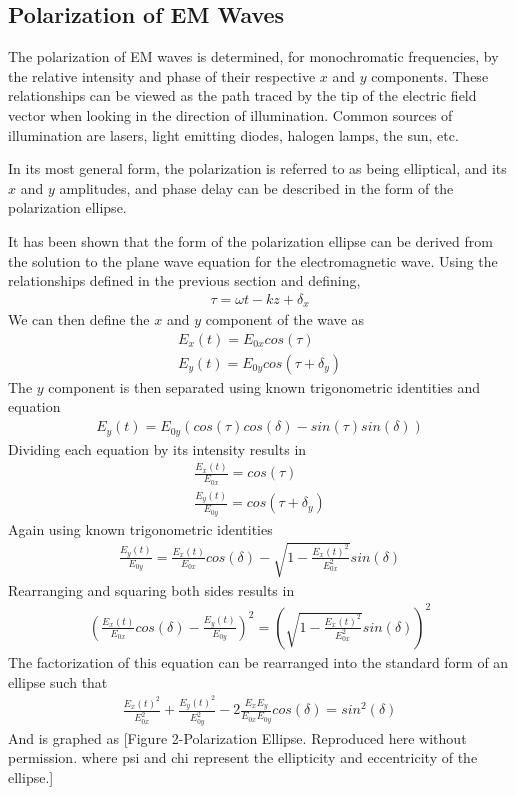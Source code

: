 \subsection{Polarization of EM Waves}
The polarization of EM waves is determined, for monochromatic frequencies, by the relative intensity and phase of their respective $x$ and $y$ components.  These relationships can be viewed as the path traced by the tip of the electric field vector when looking in the direction of illumination.  Common sources of illumination are lasers, light emitting diodes, halogen lamps, the sun, etc.

In its most general form, the polarization is referred to as being elliptical, and its $x$ and $y$ amplitudes, and phase delay can be described in the form of the polarization ellipse.

It has been shown that the form of the polarization ellipse can be derived from the solution to the plane wave equation for the electromagnetic wave.  Using the relationships defined in the previous section and defining,
%
\begin{align}
    \tau=\omega t-kz+\delta_x
\end{align}
%
We can then define the $x$ and $y$ component of the wave as
%
\begin{align}
	E_x (t)=E_{0x} cos(\tau)\\
	E_y (t)=E_{0y} cos(\tau+\delta_y )
\end{align}
%
The $y$ component is then separated using known trigonometric identities and equation
%
\begin{align}
E_y (t)=E_{0y} (cos(\tau) cos(\delta)-sin(\tau)sin(\delta))
\end{align}
%
Dividing each equation by its intensity results in
%
\begin{align}
    \frac{E_x (t)}{E_{0x}} =cos(\tau) \\
    \frac{E_y (t)}{E_{0y}} =cos(\tau+\delta_y )
\end{align}
%
Again using known trigonometric identities
%
\begin{align}
    \frac{E_y (t)}{E_{0y}} = \frac{E_x (t)}{E_{0x}}   cos(\delta)-\sqrt{1-\frac{E_x (t)^2}{E_{0x}^2} } sin(\delta)
\end{align}
%
Rearranging and squaring both sides results in
%
\begin{align}
    (\frac{E_x (t)}{E_{0x}}   cos(\delta)-\frac{E_y (t)}{E_{0y}} )^2=(\sqrt{1-\frac{E_x (t)^2}{E_{0x}^2} } sin(\delta))^2
\end{align}
%
The factorization of this equation can be rearranged into the standard form of an ellipse such that
%
\begin{align}
    \frac{E_x (t)^2}{E_{0x}^2} +\frac{E_y (t)^2}{E_{0y}^2} -2 \frac{E_x E_y}{E_{0x} E_{0y} } cos(\delta)=sin^2 (\delta)
\end{align}
%
And is graphed as
[Figure 2-Polarization Ellipse. Reproduced here without permission.
where psi and chi represent the ellipticity and eccentricity of the ellipse.]

